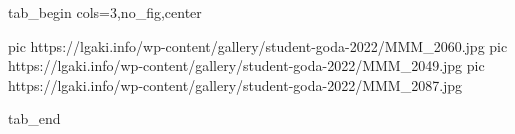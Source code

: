  
 
 
 
 


\ifcmt
  tab_begin cols=3,no_fig,center

     pic https://lgaki.info/wp-content/gallery/student-goda-2022/MMM_2060.jpg
		 pic https://lgaki.info/wp-content/gallery/student-goda-2022/MMM_2049.jpg
		 pic https://lgaki.info/wp-content/gallery/student-goda-2022/MMM_2087.jpg

  tab_end
\fi
